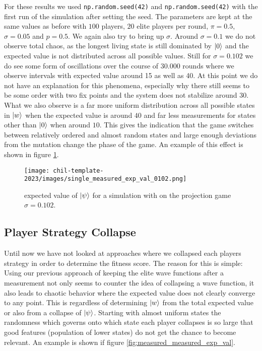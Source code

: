 For these results we used \texttt{np.random.seed(42)} and \texttt{np.random.seed(42)} with the first run of the simulation after setting the seed. The parameters are kept at the same values as before with $100$ players, $20$ elite players per round, $\pi = 0.5$, $\sigma = 0.05$ and $p = 0.5$. We again also try to bring up $\sigma$. Around $\sigma = 0.1$ we do not observe total chaos, as the longest living state is still dominated by $\ket{0}$ and the expected value is not distributed across all possible values. Still for $\sigma = 0.102$ we do see some form of oscillations over the course of $30.000$ rounds where we observe intervals with expected value around 15 as well as 40. At this point we do not have an explanation for this phenomena, especially why there still seems to be some order with two fix points and the system does not stabilize around $30$. What we also observe is a far more uniform distribution across all possible states in $\ket{w}$ when the expected value is around $40$ and far less measurements for states other than $\ket{0}$ when around $10$. This gives the indication that the game switches between relatively ordered and almost random states and large enough deviations from the mutation change the phase of the game. An example of this effect is shown in figure \ref{fig:single_measured_exp_val_0102}.

\begin{figure}[h]
    \centering
    \texttt{[image: chil-template-2023/images/single\_measured\_exp\_val\_0102.png]}
    \caption{expected value of $\ket{\psi}$ for a simulation with on the projection game $\sigma = 0.102$.}
    \label{fig:single_measured_exp_val_0102}
\end{figure}

\subsection{Player Strategy Collapse}

Until now we have not looked at approaches where we collapsed each players strategy in order to determine the fitness score. The reason for this is simple: Using our previous approach of keeping the elite wave functions after a measurement not only seems to counter the idea of collapsing a wave function, it also leads to chaotic behavior where the expected value does not clearly converge to any point. This is regardless of determining $\ket{w}$ from the total expected value or also from a collapse of $\ket{\psi}$. Starting with almost uniform states the randomness which governs onto which state each player collapses is so large that good features (population of lower states) do not get the chance to become relevant. An example is shown if figure \ref{fig:measured_measured_exp_val}.\\

